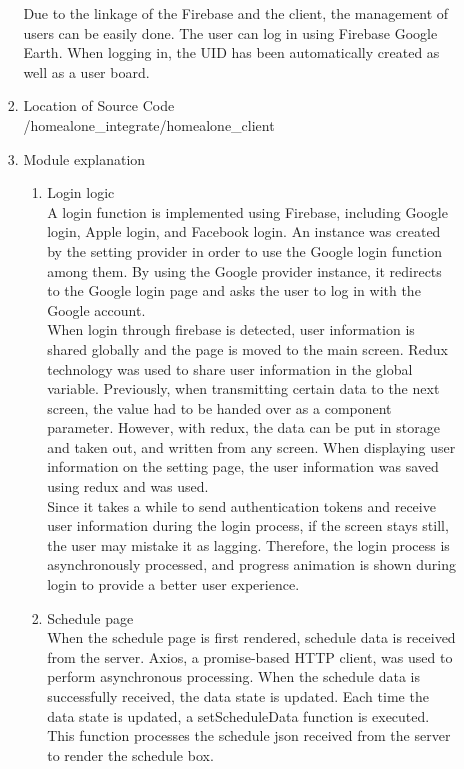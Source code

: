\documentclass[conference]{IEEEtran}
\begin{document}
\begin{enumerate}[label=\arabic*.]
\begin{enumerate}[label=\arabic*.]
\begin{enumerate}[label=\alph*.]
        Due to the linkage of the Firebase and the client, the management of users can be easily done. The user can log in using Firebase Google Earth. When logging in, the UID has been automatically created as well as a user board. \\
        \item{\large{Location of Source Code}}\\
        /homealone\_integrate/homealone\_client\\
        \item Module explanation\\
        \begin{enumerate}[label=\roman*.]
            \item {\large{Login logic}}\\
            A login function is implemented using Firebase, including Google login, Apple login, and Facebook login. An instance was created by the setting provider in order to use the Google login function among them. By using the Google provider instance, it redirects to the Google login page and asks the user to log in with the Google account. \\
            When login through firebase is detected, user information is shared globally and the page is moved to the main screen. Redux technology was used to share user information in the global variable. Previously, when transmitting certain data to the next screen, the value had to be handed over as a component parameter. However, with redux, the data can be put in storage and taken out, and written from any screen. When displaying user information on the setting page, the user information was saved using redux and was used. \\
            Since it takes a while to send authentication tokens and receive user information during the login process, if the screen stays still, the user may mistake it as lagging. Therefore, the login process is asynchronously processed, and progress animation is shown during login to provide a better user experience. \\
            \item {\large{Schedule page}}\\
            When the schedule page is first rendered, schedule data is received from the server. Axios, a promise-based HTTP client, was used to perform asynchronous processing. When the schedule data is successfully received, the data state is updated. Each time the data state is updated, a setScheduleData function is executed. This function processes the schedule json received from the server to render the schedule box. \\

\end{enumerate}
\end{enumerate}
\end{enumerate}
\end{enumerate}
\end{document}
